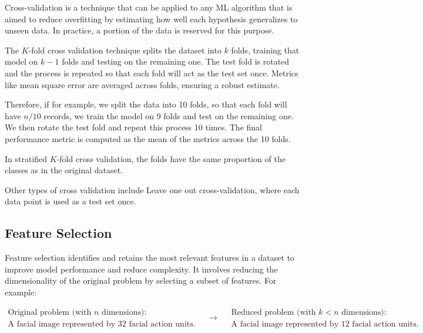 		Cross-validation is a technique that can be applied to any ML algorithm that is aimed to reduce overfitting by estimating how well each hypothesis generalizes to unseen data. In practice, a portion of the data is reserved for this purpose.
		
		The $K$-fold cross validation technique splits the dataset into $k$ folds, training that model on $k-1$ folds and testing on the remaining one. The test fold is rotated and the process is repeated so that each fold will act as the test set once. Metrics like mean square error are averaged across folds, ensuring a robust estimate.
		
		Therefore, if for example, we split the data into 10 folds, so that each fold will have $n/10$ records, we train the model on 9 folds and test on the remaining one. We then rotate the test fold and repeat this process 10 times. The final performance metric is computed as the mean of the metrics across the 10 folds.
		
		In stratified $K$-fold cross validation, the folds have the same proportion of the classes as in the original dataset.
		
		Other types of cross validation include Leave one out cross-validation, where each data point is used as a test set once.
	
	
	
	
	
	
	\subsection{Feature Selection}
	
	Feature selection identifies and retains the most relevant features in a dataset to improve model performance and reduce complexity. It involves reducing the dimensionality of the original problem by selecting a subset of features. For example:
	
	$$
	\begin{array}{c}
		\text{Original problem (with } n \text{ dimensions):} \\
		\text{A facial image represented by } 32 \text{ facial action units.}
	\end{array}
	\quad \longrightarrow \quad
	\begin{array}{c}
		\text{Reduced problem (with } k < n \text{ dimensions):} \\
		\text{A facial image represented by } 12 \text{ facial action units.}
	\end{array}
	$$
	
